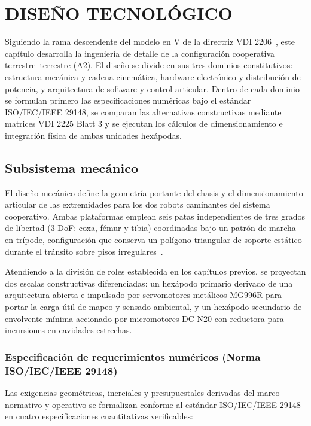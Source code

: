 \chapter{DISEÑO TECNOLÓGICO}

Siguiendo la rama descendente del modelo en V de la directriz VDI 2206~\cite{VDI2206_2004}, este capítulo desarrolla la ingeniería de detalle de la configuración cooperativa terrestre--terrestre (A2). El diseño se divide en sus tres dominios constitutivos: estructura mecánica y cadena cinemática, hardware electrónico y distribución de potencia, y arquitectura de software y control articular. Dentro de cada dominio se formulan primero las especificaciones numéricas bajo el estándar ISO/IEC/IEEE 29148, se comparan las alternativas constructivas mediante matrices VDI 2225 Blatt 3 y se ejecutan los cálculos de dimensionamiento e integración física de ambas unidades hexápodas.

\section{Subsistema mecánico}

El diseño mecánico define la geometría portante del chasis y el dimensionamiento articular de las extremidades para los dos robots caminantes del sistema cooperativo. Ambas plataformas emplean seis patas independientes de tres grados de libertad (3 DoF: coxa, fémur y tibia) coordinadas bajo un patrón de marcha en trípode, configuración que conserva un polígono triangular de soporte estático durante el tránsito sobre pisos irregulares~\cite{Sensors2021_HexapodReview, Wu2024_SpiderLegDesign}.

Atendiendo a la división de roles establecida en los capítulos previos, se proyectan dos escalas constructivas diferenciadas: un hexápodo primario derivado de una arquitectura abierta e impulsado por servomotores metálicos MG996R para portar la carga útil de mapeo y sensado ambiental, y un hexápodo secundario de envolvente mínima accionado por micromotores DC N20 con reductora para incursiones en cavidades estrechas.

\subsection{Especificación de requerimientos numéricos (Norma ISO/IEC/IEEE 29148)}

Las exigencias geométricas, inerciales y presupuestales derivadas del marco normativo y operativo se formalizan conforme al estándar ISO/IEC/IEEE 29148 en cuatro especificaciones cuantitativas verificables:

